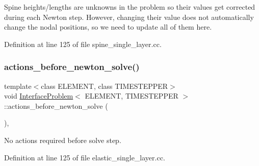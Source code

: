 Spine heights/lengths are unknowns in the problem so their values get corrected during each Newton step. However, changing their value does not automatically change the nodal positions, so we need to update all of them here. 



Definition at line 125 of file spine\+\_\+single\+\_\+layer.\+cc.

\mbox{\label{classInterfaceProblem_ade63c8a74f666edf530460b989968b4f}} 
\subsubsection{\texorpdfstring{actions\+\_\+before\+\_\+newton\+\_\+solve()}{actions\_before\_newton\_solve()}\hspace{0.1cm}{\footnotesize\ttfamily [1/2]}}
{\footnotesize\ttfamily template$<$class E\+L\+E\+M\+E\+NT, class T\+I\+M\+E\+S\+T\+E\+P\+P\+ER$>$ \\
void \hyperlink{classInterfaceProblem}{Interface\+Problem}$<$ E\+L\+E\+M\+E\+NT, T\+I\+M\+E\+S\+T\+E\+P\+P\+ER $>$\+::actions\+\_\+before\+\_\+newton\+\_\+solve (\begin{DoxyParamCaption}{ }\end{DoxyParamCaption})\hspace{0.3cm}{\ttfamily [inline]}, {\ttfamily [private]}}



No actions required before solve step. 



Definition at line 125 of file elastic\+\_\+single\+\_\+layer.\+cc.

\mbox{\label{classInterfaceProblem_ade63c8a74f666edf530460b989968b4f}} 
